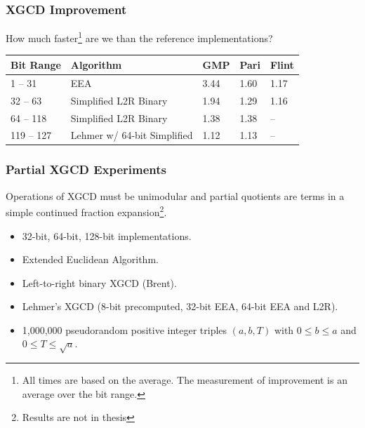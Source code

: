 \documentclass{beamer}
\newcommand{\smallfont}{\fontsize{6pt}{7.2}\selectfont}
\begin{document}
\begin{frame}
\frametitle{XGCD Improvement}

How much faster\footnote{\smallfont All times are based on the average.  The measurement of improvement is an average over the bit range.} are we than the reference implementations?
\begin{table}
\centering
\begin{tabular}{ | l | l | l | l | l | }
\hline
Bit Range & Algorithm & GMP & Pari & Flint \\
\hline
1 -- 31 & EEA & 3.44 & 1.60 & 1.17 \\
32 -- 63 & Simplified L2R Binary & 1.94 & 1.29 & 1.16 \\
64 -- 118 & Simplified L2R Binary & 1.38 & 1.38 & -- \\
119 -- 127 & Lehmer w/ 64-bit Simplified & 1.12 & 1.13 & -- \\
\hline
\end{tabular}
\end{table}

\end{frame}

\begin{frame}
\frametitle{Partial XGCD Experiments}
Operations of XGCD must be unimodular and partial quotients are terms in a simple continued fraction expansion\footnote{Results are not in thesis}.
\begin{itemize}
\item 32-bit, 64-bit, 128-bit implementations.
\item Extended Euclidean Algorithm.
\item Left-to-right binary XGCD (Brent).
\item Lehmer's XGCD (8-bit precomputed, 32-bit EEA, 64-bit EEA and L2R).
\item 1,000,000 pseudorandom positive integer triples $(a, b, T)$ with $0 \le b \le a$ and $0 \le T \le \sqrt a$.
\end{itemize}
\end{frame}
\end{document}
